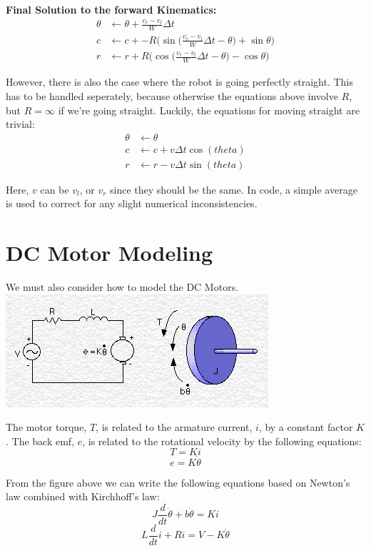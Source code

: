 \documentclass{article}
\begin{document}
\textbf{Final Solution to the forward Kinematics:}
\begin{align}
 \theta &\leftarrow \theta + \frac{v_r-v_l}{W}\Delta t \\
  c &\leftarrow c + -R\Bigg(\sin{\Big(\frac{v_r-v_l}{W}\Delta t-\theta\Big)}+\sin{\theta}\Bigg) \\
  r &\leftarrow r + R\Bigg(\cos{\Big(\frac{v_r-v_l}{W}\Delta t-\theta\Big)}-\cos{\theta}\Bigg)
\end{align}

However, there is also the case where the robot is going perfectly straight. This has to be handled seperately, because otherwise the equations above involve $R$, but $R=\infty$ if we're going straight. Luckily, the equations for moving straight are trivial:
\begin{align}
 \theta &\leftarrow \theta \\
  c &\leftarrow c + v\Delta t\cos(theta) \\
  r &\leftarrow r - v\Delta t\sin(theta)
\end{align}

Here, $v$ can be $v_l$, or $v_r$ since they should be the same. In code, a simple average is used to correct for any slight numerical inconsistencies. \\

\section{DC Motor Modeling}
We must also consider how to model the DC Motors. \\

\includegraphics[scale=0.5]{./dc_motor_model.png}

The motor torque, $T$, is related to the armature current, $i$, by a constant factor $K$. The back emf, $e$, is related to the rotational velocity by the following equations:
$$T=Ki$$
$$e=K\dot{\theta}$$

From the figure above we can write the following equations based on Newton's law combined with Kirchhoff's law:
$$J\frac{d}{dt}\dot{\theta} + b\dot{\theta} = Ki$$
$$L\frac{d}{dt}i+Ri=V-K\dot{\theta}$$
\end{document}
